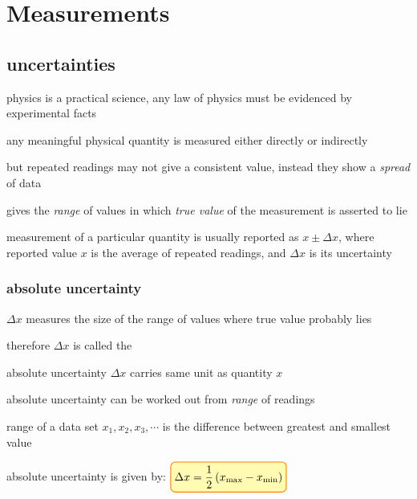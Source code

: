 \section{Measurements}

\subsection{uncertainties}

physics is a practical science, any law of physics must be evidenced by experimental facts

any meaningful physical quantity is measured either directly or indirectly

but repeated readings may not give a consistent value, instead they show a \emph{spread} of data

 gives the \emph{range} of values in which \emph{true value} of the measurement is asserted to lie

measurement of a particular quantity is usually reported as $x \pm \Delta x$, where reported value $x$ is the average of repeated readings, and $\Delta x$ is its uncertainty

\subsubsection{absolute uncertainty}

$\Delta x$ measures the size of the range of values where true value probably lies

therefore $\Delta x$ is called the 

\cmt absolute uncertainty $\Delta x$ carries same unit as quantity $x$

\cmt absolute uncertainty can be worked out from \emph{range} of readings

range of a data set ${x_1, x_2, x_3, \cdots}$ is the difference between greatest and smallest value

absolute uncertainty is given by: $\boxed{\Delta x = \frac{1}{2}\left(x_\tmax-x_\tmin\right)}$

